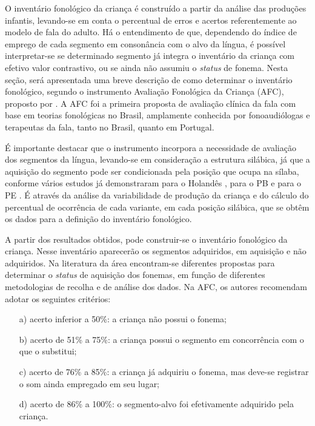 \documentclass[output=paper,colorlinks,citecolor=brown,booklanguage=portuguese]{langscibook}
\begin{document}
O inventário fonológico da criança é construído a partir da análise das produções infantis, levando-se em conta o percentual de erros e acertos referentemente ao modelo de fala do adulto. Há o entendimento de que, dependendo do índice de emprego de cada segmento em consonância com o alvo da língua, é possível interpretar-se se determinado segmento já integra o inventário da criança com efetivo valor contrastivo, ou se ainda não assumiu o \emph{status} de fonema. Nesta seção, será apresentada uma breve descrição de como determinar o inventário fonológico, segundo o instrumento Avaliação Fonológica da Criança (AFC), proposto por \citet{Yavas1991}. A AFC foi a primeira proposta de avaliação clínica da fala com base em teorias fonológicas no Brasil, amplamente conhecida por fonoaudiólogas e terapeutas da fala, tanto no Brasil, quanto em Portugal.

É importante destacar que o instrumento incorpora a necessidade de avaliação dos segmentos da língua, levando-se em consideração a estrutura silábica, já que a aquisição do segmento pode ser condicionada pela posição que ocupa na sílaba, conforme vários estudos já demonstraram para o Holandês \citep{Fikkert1994}, para o PB \citep{Ribas2002, Mezzomo2004} e para o PE \citep{Freitas1997}. É através da análise da variabilidade de produção da criança e do cálculo do percentual de ocorrência de cada variante, em cada posição silábica, que se obtêm os dados para a definição do inventário fonológico. 

A partir dos resultados obtidos, pode construir-se o inventário fonológico da criança. Nesse inventário aparecerão os segmentos adquiridos, em aquisição e não adquiridos. Na literatura da área encontram-se diferentes propostas para determinar o \emph{status} de aquisição dos fonemas, em função de diferentes metodologias de recolha e de análise dos dados. Na AFC, os autores recomendam adotar os seguintes critérios:


    \begin{enumerate}
        \item [a)] acerto inferior a 50\%: a criança não possui o fonema;
        \item[b)]	acerto de 51\% a 75\%: a criança possui o segmento em concorrência com o que o substitui;
        \item[c)] acerto de 76\% a 85\%: a criança já adquiriu o fonema, mas deve-se registrar o som ainda empregado em seu lugar; 
        \item[d)] acerto de 86\% a 100\%: o segmento-alvo foi efetivamente adquirido pela criança.
    \end{enumerate}
\end{document}
